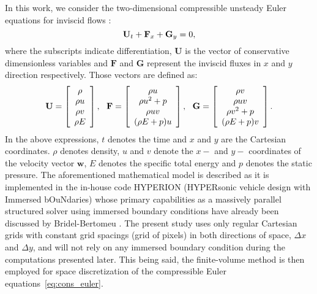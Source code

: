 In this work, we consider the two-dimensional compressible unsteady Euler equations for inviscid flows \cite{masatsuka2013}:
\eqSpace
\begin{equation}
    \mathbf{U}_t + \mathbf{F}_x + \mathbf{G}_y = 0,
    \label{eq:cons_euler}
    \eqSpace
\end{equation}
\noindent where the subscripts indicate differentiation, $\mathbf{U}$ is the 
vector of conservative dimensionless variables and $\mathbf{F}$ and $\mathbf{G}$ 
represent the inviscid fluxes in $x$ and $y$ direction respectively.
Those vectors are defined as:
\eqSpace
\eqSpace
\eqSpace
\begin{equation}
    \begin{array}{l}
        \mathbf{U} = \left[\begin{array}{c}\rho \\ \rho u \\ \rho v \\ \rho E\end{array}\right], ~~
        \mathbf{F} = \left[\begin{array}{c}\rho u \\ \rho u^2 + p\\ \rho u v\\ (\rho E + p)u\end{array}\right], ~~
        \mathbf{G} = \left[\begin{array}{c}\rho v \\ \rho u v \\ \rho v^2 + p \\ (\rho E + p)v\end{array}\right].
    \end{array}
    \label{eq:cons_euler_vectors}
    \eqSpace
\end{equation}
\noindent In the above expressions, $t$ denotes the time and $x$ and $y$ are the Cartesian coordinates.
$\rho$ denotes density, $u$ and $v$ denote the $x-$ and $y-$
coordinates of the velocity vector $\mathbf{w}$,
$E$ denotes the specific total energy and $p$ denotes the static pressure.
The aforementioned mathematical model is described as it is implemented in the in-house code HYPERION (HYPERsonic vehicle design with Immersed bOuNdaries) whose primary capabilities as a massively parallel structured solver using immersed boundary conditions have already been discussed by Bridel-Bertomeu \cite{bridel2021immersed}.
The present study uses only regular Cartesian grids with constant grid spacings (grid of pixels) in both directions of space, $\Delta x$ and $\Delta y$, and will not rely on any immersed boundary condition during the computations presented later.
This being said, the finite-volume method \cite{leveque2002finite,trangenstein2007numerical,toro2013riemann} is then employed for space discretization of the compressible Euler equations~\eqref{eq:cons_euler}.


